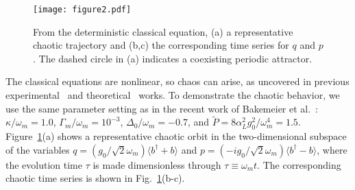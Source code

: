 \documentclass[12pt]{wlscirep}
\begin{document}
\begin{figure}
\centering
\texttt{[image: figure2.pdf]}
\caption{From the deterministic classical equation, (a) a representative
chaotic trajectory and (b,c) the corresponding time series for $q$ and
$p$. The dashed circle in (a) indicates a coexisting periodic attractor.}
\label{fig:classical}
\end{figure}

The classical equations are nonlinear, so chaos can arise, as uncovered in
previous experimental~\cite{CV:2007,CCV:2007} 
and theoretical~\cite{BAF:2015,WHLG:2014,MYSXLYW:2014} works. 
To demonstrate the chaotic behavior, we use the same parameter setting as 
in the recent work of Bakemeier et al.~\cite{BAF:2015}:
$\kappa/\omega_m=1.0$, $\Gamma_m/\omega_m=10^{-3}$, 
$\Delta_0/\omega_m=-0.7$, and $\tilde{P}=8\alpha_L^2g_0^2/\omega_m^4=1.5$. 
Figure~\ref{fig:classical}(a) shows a representative 
chaotic orbit in the two-dimensional subspace of the variables 
$q=(g_0/\sqrt{2}\omega_m)\langle b^\dagger+b\rangle$ and 
$p=(-ig_0/\sqrt{2}\omega_m)\langle b^\dagger-b\rangle$, where the 
evolution time $\tau$ is made dimensionless through $\tau \equiv \omega_m t$. 
The corresponding chaotic time series is shown in 
Fig.~\ref{fig:classical}(b-c). 
\end{document}

